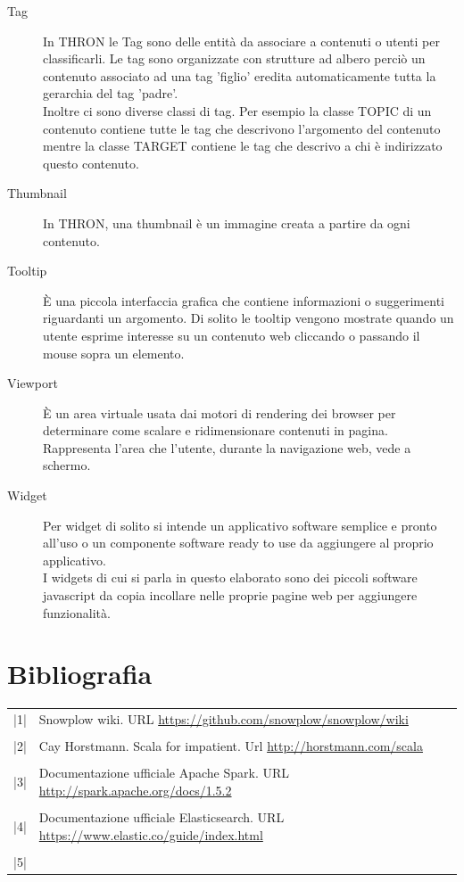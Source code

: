 \documentclass[a4paper, 12pt, twoside, openright]{book}
\begin{document}
\begin {description}
\item[Tag]
In THRON le Tag sono delle entità da associare a contenuti o utenti per classificarli. Le tag sono organizzate con strutture ad albero perciò un contenuto associato ad una tag 'figlio' eredita automaticamente tutta la gerarchia del tag 'padre'.\\
Inoltre ci sono diverse classi di tag. Per esempio la classe TOPIC di un contenuto contiene tutte le tag che descrivono l'argomento del contenuto mentre la classe TARGET contiene le tag che descrivo a chi è indirizzato questo contenuto.
\item[Thumbnail]
In THRON, una thumbnail è un immagine creata a partire da ogni contenuto.
\item[Tooltip]
\`{E} una piccola interfaccia grafica che contiene informazioni o suggerimenti riguardanti un argomento. Di solito le tooltip vengono mostrate quando un utente esprime interesse su un contenuto web cliccando o passando il mouse sopra un elemento.

\item[Viewport]
\`{E} un area virtuale usata dai motori di rendering dei browser per determinare come scalare e ridimensionare contenuti in pagina. Rappresenta l'area che l'utente, durante la navigazione web, vede a schermo.

\item[Widget]
Per widget di solito si intende un applicativo software semplice e pronto all'uso o un componente software ready to use da aggiungere al proprio applicativo.\\
I widgets di cui si parla in questo elaborato sono dei piccoli software javascript da copia incollare nelle proprie pagine web per aggiungere funzionalità.


\end{description}

\chapter{Bibliografia}

\thispagestyle{empty}

\begin{tabular}{ m{2em} m{28em} }
|1| & Snowplow wiki. URL \url{https://github.com/snowplow/snowplow/wiki} \\
    & \\
|2| & Cay Horstmann. Scala for impatient. Url \url{http://horstmann.com/scala}\\
	& \\
|3| & Documentazione ufficiale Apache Spark. URL \url{http://spark.apache.org/docs/1.5.2}\\
	& \\
|4| & Documentazione ufficiale Elasticsearch. URL \url{https://www.elastic.co/guide/index.html}\\
	& \\
|5| & 
\end{tabular}
\end{document}

